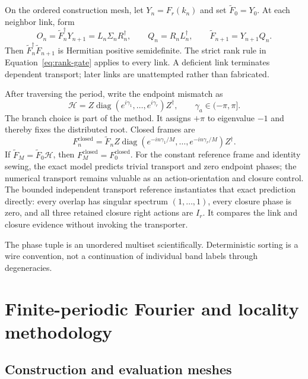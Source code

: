 \documentclass[11pt]{article}
\begin{document}
On the ordered construction mesh, let $Y_n=F_r(k_n)$ and set
$\widetilde F_0=Y_0$. At each neighbor link, form
\begin{equation}
 O_n=\widetilde F_n^\dagger Y_{n+1}=L_n\Sigma_nR_n^\dagger,
 \qquad
 Q_n=R_nL_n^\dagger,
 \qquad
 \widetilde F_{n+1}=Y_{n+1}Q_n.
 \label{eq:parallel-transport}
\end{equation}
Then $\widetilde F_n^\dagger\widetilde F_{n+1}$ is Hermitian positive semidefinite. The
strict rank rule in Equation~\eqref{eq:rank-gate} applies to every link. A deficient link
terminates dependent transport; later links are unattempted rather than fabricated.

After traversing the period, write the endpoint mismatch as
\begin{equation}
 \mathcal H=Z\operatorname{diag}(e^{i\gamma_1},\ldots,e^{i\gamma_r})Z^\dagger,
 \qquad \gamma_a\in(-\pi,\pi].
 \label{eq:holonomy}
\end{equation}
The branch choice is part of the method. It assigns $+\pi$ to eigenvalue $-1$ and thereby
fixes the distributed root. Closed frames are
\begin{equation}
 F_n^{\mathrm{closed}}=\widetilde F_n
 Z\operatorname{diag}(e^{-in\gamma_1/M},\ldots,e^{-in\gamma_r/M})Z^\dagger.
 \label{eq:distributed-closure}
\end{equation}
If $\widetilde F_M=\widetilde F_0\mathcal H$, then
$F_M^{\mathrm{closed}}=F_0^{\mathrm{closed}}$. For the constant reference frame and
identity sewing, the exact model predicts trivial transport and zero endpoint phases;
the numerical transport remains valuable as an action-orientation and closure control.
The bounded independent transport reference instantiates that exact prediction directly:
every overlap has singular spectrum $(1,\ldots,1)$, every closure phase is zero, and all
three retained closure right actions are $I_r$. It compares the link and closure evidence
without invoking the transporter.

The phase tuple is an unordered multiset scientifically. Deterministic sorting is a wire
convention, not a continuation of individual band labels through degeneracies.

\section{Finite-periodic Fourier and locality methodology}
\label{sec:fourier}

\subsection{Construction and evaluation meshes}
\end{document}
